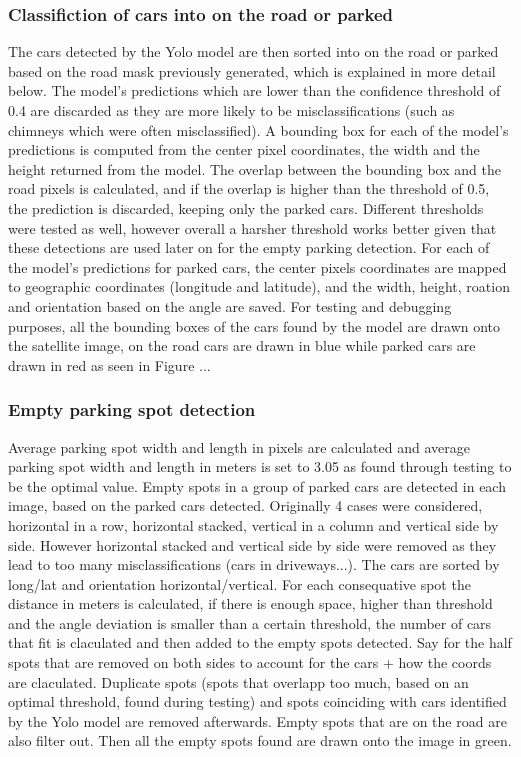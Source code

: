 \subsubsection{Classifiction of cars into on the road or parked}
The cars detected by the Yolo model are then sorted into on the road or parked based on the road mask previously generated, which is explained in more detail below.
The model's predictions which are lower than the confidence threshold of 0.4 are discarded as they are more likely to be misclassifications (such as chimneys which were often misclassified).
A bounding box for each of the model's predictions is computed from the center pixel coordinates, the width and the height returned from the model.
The overlap between the bounding box and the road pixels is calculated, and if the overlap is higher than the threshold of 0.5, the prediction is discarded, keeping only the parked cars.
Different thresholds were tested as well, however overall a harsher threshold works better given that these detections are used later on for the empty parking detection.
For each of the model's predictions for parked cars, the center pixels coordinates are mapped to geographic coordinates (longitude and latitude), and the width, height, roation and orientation based on the angle are saved.
For testing and debugging purposes, all the bounding boxes of the cars found by the model are drawn onto the satellite image, on the road cars are drawn in blue while parked cars are drawn in red as seen in Figure ...

\subsubsection{Empty parking spot detection}
Average parking spot width and length in pixels are calculated and average parking spot width and length in meters is set to 3.05 as found through testing to be the optimal value.
Empty spots in a group of parked cars are detected in each image, based on the parked cars detected.
Originally 4 cases were considered, horizontal in a row, horizontal stacked, vertical in a column and vertical side by side. However horizontal stacked and vertical side by side were removed as they lead to too many misclassifications (cars in driveways...).
The cars are sorted by long/lat and orientation horizontal/vertical. For each consequative spot the distance in meters is calculated, if there is enough space, higher than threshold and the angle deviation is smaller than a certain threshold, the number of cars that fit is claculated and then added to the empty spots detected.
Say for the half spots that are removed on both sides to account for the cars + how the coords are claculated.
Duplicate spots (spots that overlapp too much, based on an optimal threshold, found during testing) and spots coinciding with cars identified by the Yolo model are removed afterwards.
Empty spots that are on the road are also filter out.
Then all the empty spots found are drawn onto the image in green.

